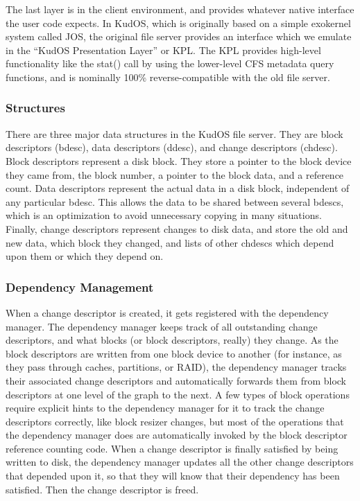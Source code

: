 The last layer is in the client environment, and provides whatever native
interface the user code expects. In KudOS, which is originally based on a simple
exokernel system called JOS, the original file server provides an interface
which we emulate in the ``KudOS Presentation Layer'' or KPL. The KPL provides
high-level functionality like the stat() call by using the lower-level CFS
metadata query functions, and is nominally 100\% reverse-compatible with the old
file server.

\subsubsection{Structures}
\label{sec:solution:arch:structs}

There are three major data structures in the KudOS file server. They are block
descriptors (bdesc), data descriptors (ddesc), and change descriptors (chdesc).
Block descriptors represent a disk block. They store a pointer to the block
device they came from, the block number, a pointer to the block data, and a
reference count. Data descriptors represent the actual data in a disk block,
independent of any particular bdesc. This allows the data to be shared between
several bdescs, which is an optimization to avoid unnecessary copying in many
situations. Finally, change descriptors represent changes to disk data, and
store the old and new data, which block they changed, and lists of other chdescs
which depend upon them or which they depend on.

\subsubsection{Dependency Management}
\label{sec:solution:arch:depman}

When a change descriptor is created, it gets registered with the dependency
manager. The dependency manager keeps track of all outstanding change
descriptors, and what blocks (or block descriptors, really) they change. As the
block descriptors are written from one block device to another (for instance, as
they pass through caches, partitions, or RAID), the dependency manager tracks
their associated change descriptors and automatically forwards them from block
descriptors at one level of the graph to the next. A few types of block
operations require explicit hints to the dependency manager for it to track the
change descriptors correctly, like block resizer changes, but most of the
operations that the dependency manager does are automatically invoked by the
block descriptor reference counting code. When a change descriptor is finally
satisfied by being written to disk, the dependency manager updates all the other
change descriptors that depended upon it, so that they will know that their
dependency has been satisfied. Then the change descriptor is freed.

